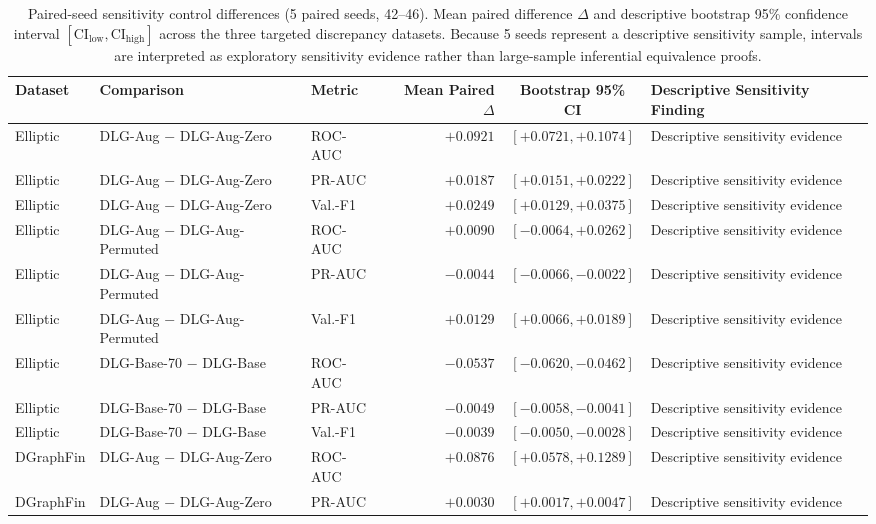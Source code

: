 \begin{table}[t]
\centering
\caption{Paired-seed sensitivity control differences (5 paired seeds, 42--46). Mean paired difference $\Delta$ and descriptive bootstrap 95\% confidence interval $[\mathrm{CI}_{\mathrm{low}}, \mathrm{CI}_{\mathrm{high}}]$ across the three targeted discrepancy datasets. Because 5 seeds represent a descriptive sensitivity sample, intervals are interpreted as exploratory sensitivity evidence rather than large-sample inferential equivalence proofs.}
\label{tab:capacity_controls_paired_deltas}
\scriptsize
\begin{tabular}{@{}l l l r c l@{}}
\toprule
\textbf{Dataset} & \textbf{Comparison} & \textbf{Metric} & \textbf{Mean Paired $\Delta$} & \textbf{Bootstrap 95\% CI} & \textbf{Descriptive Sensitivity Finding} \\
\midrule
Elliptic & DLG-Aug $-$ DLG-Aug-Zero & ROC-AUC & $+0.0921$ & $[+0.0721, +0.1074]$ & Descriptive sensitivity evidence \\
Elliptic & DLG-Aug $-$ DLG-Aug-Zero & PR-AUC & $+0.0187$ & $[+0.0151, +0.0222]$ & Descriptive sensitivity evidence \\
Elliptic & DLG-Aug $-$ DLG-Aug-Zero & Val.-F1 & $+0.0249$ & $[+0.0129, +0.0375]$ & Descriptive sensitivity evidence \\
Elliptic & DLG-Aug $-$ DLG-Aug-Permuted & ROC-AUC & $+0.0090$ & $[-0.0064, +0.0262]$ & Descriptive sensitivity evidence \\
Elliptic & DLG-Aug $-$ DLG-Aug-Permuted & PR-AUC & $-0.0044$ & $[-0.0066, -0.0022]$ & Descriptive sensitivity evidence \\
Elliptic & DLG-Aug $-$ DLG-Aug-Permuted & Val.-F1 & $+0.0129$ & $[+0.0066, +0.0189]$ & Descriptive sensitivity evidence \\
Elliptic & DLG-Base-70 $-$ DLG-Base & ROC-AUC & $-0.0537$ & $[-0.0620, -0.0462]$ & Descriptive sensitivity evidence \\
Elliptic & DLG-Base-70 $-$ DLG-Base & PR-AUC & $-0.0049$ & $[-0.0058, -0.0041]$ & Descriptive sensitivity evidence \\
Elliptic & DLG-Base-70 $-$ DLG-Base & Val.-F1 & $-0.0039$ & $[-0.0050, -0.0028]$ & Descriptive sensitivity evidence \\
\midrule
DGraphFin & DLG-Aug $-$ DLG-Aug-Zero & ROC-AUC & $+0.0876$ & $[+0.0578, +0.1289]$ & Descriptive sensitivity evidence \\
DGraphFin & DLG-Aug $-$ DLG-Aug-Zero & PR-AUC & $+0.0030$ & $[+0.0017, +0.0047]$ & Descriptive sensitivity evidence \\

\end{tabular}
\end{table}
